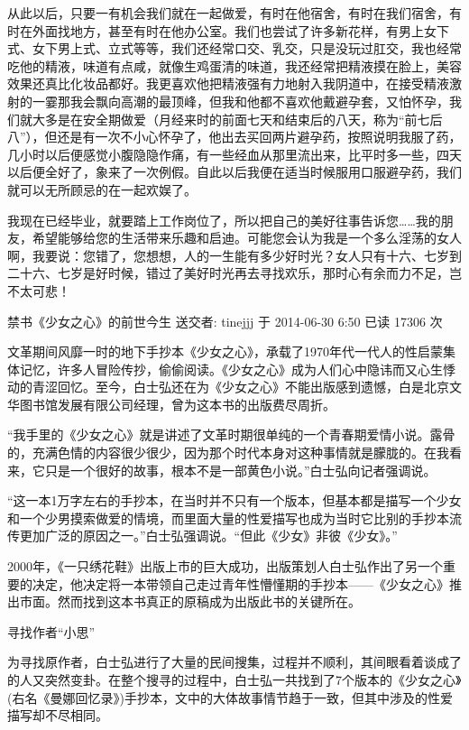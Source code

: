 \documentclass[12pt,UTF8]{ctexbook}
\begin{document}
从此以后，只要一有机会我们就在一起做爱，有时在他宿舍，有时在我们宿舍，有时在外面找地方，甚至有时在他办公室。我们也尝试了许多新花样，有男上女下式、女下男上式、立式等等，我们还经常口交、乳交，只是没玩过肛交，我也经常吃他的精液，味道有点咸，就像生鸡蛋清的味道，我还经常把精液摸在脸上，美容效果还真比化妆品都好。我更喜欢他把精液强有力地射入我阴道中，在接受精液激射的一霎那我会飘向高潮的最顶峰，但我和他都不喜欢他戴避孕套，又怕怀孕，我们就大多是在安全期做爱（月经来时的前面七天和结束后的八天，称为“前七后八”），但还是有一次不小心怀孕了，他出去买回两片避孕药，按照说明我服了药，几小时以后便感觉小腹隐隐作痛，有一些经血从那里流出来，比平时多一些，四天以后便全好了，象来了一次例假。自此以后我便在适当时候服用口服避孕药，我们就可以无所顾忌的在一起欢娱了。

我现在已经毕业，就要踏上工作岗位了，所以把自己的美好往事告诉您……我的朋友，希望能够给您的生活带来乐趣和启迪。可能您会认为我是一个多么淫荡的女人啊，我要说：您错了，您想想，人的一生能有多少好时光？女人只有十六、七岁到二十六、七岁是好时候，错过了美好时光再去寻找欢乐，那时心有余而力不足，岂不太可悲！

禁书《少女之心》的前世今生 送交者: tinejjj 于 2014-06-30 6:50 已读 17306 次

文革期间风靡一时的地下手抄本《少女之心》，承载了1970年代一代人的性启蒙集体记忆，许多人冒险传抄，偷偷阅读。《少女之心》成为人们心中隐讳而又心生悸动的青涩回忆。至今，白士弘还在为《少女之心》不能出版感到遗憾，白是北京文华图书馆发展有限公司经理，曾为这本书的出版费尽周折。

“我手里的《少女之心》就是讲述了文革时期很单纯的一个青春期爱情小说。露骨的，充满色情的内容很少很少，因为那个时代本身对这种事情就是朦胧的。在我看来，它只是一个很好的故事，根本不是一部黄色小说。”白士弘向记者强调说。

“这一本1万字左右的手抄本，在当时并不只有一个版本，但基本都是描写一个少女和一个少男摸索做爱的情境，而里面大量的性爱描写也成为当时它比别的手抄本流传更加广泛的原因之一。”白士弘强调说。“但此《少女》非彼《少女》。”

2000年，《一只绣花鞋》出版上市的巨大成功，出版策划人白士弘作出了另一个重要的决定，他决定将一本带领自己走过青年性懵懂期的手抄本——《少女之心》推出市面。然而找到这本书真正的原稿成为出版此书的关键所在。

寻找作者“小思”

为寻找原作者，白士弘进行了大量的民间搜集，过程并不顺利，其间眼看着谈成了的人又突然变卦。在整个搜寻的过程中，白士弘一共找到了7个版本的《少女之心》(右名《曼娜回忆录》)手抄本，文中的大体故事情节趋于一致，但其中涉及的性爱描写却不尽相同。
\end{document}
